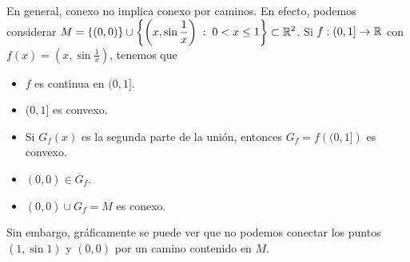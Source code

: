 \begin{eg}
	En general, conexo no implica conexo por caminos. En efecto, podemos considerar $\displaystyle M = \left\{ \left(0,0\right)\right\} \cup \left\{ \left(x,\sin \frac{1}{x}\right) \; : \; 0 < x \leq 1\right\} \subset \mathbb{R}^{2} $. Si $\displaystyle f : (0,1] \to \mathbb{R} $ con $\displaystyle f\left(x\right) = \left(x,\sin \frac{1}{x}\right) $, tenemos que
	\begin{itemize}
		\item $\displaystyle f $ es continua en $\displaystyle (0,1] $.
		\item $\displaystyle (0,1] $ es convexo.
		\item Si $\displaystyle G_{f}\left(x\right) $ es la segunda parte de la unión, entonces $\displaystyle G_{f} = f\left((0,1]\right) $ es convexo.
		\item $\displaystyle \left(0,0\right) \in \overline{G}_{f} $.
		\item $\displaystyle \left(0,0\right)\cup G_{f} = M $ es conexo.
	\end{itemize}
	Sin embargo, gráficamente se puede ver que no podemos conectar los puntos $\displaystyle \left(1,\sin 1\right) $ y $\displaystyle \left(0,0\right) $ por un camino contenido en $\displaystyle M $.
\end{eg}


